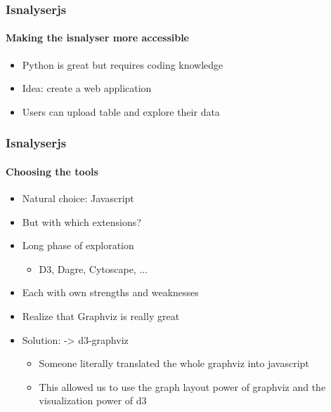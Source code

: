 \documentclass[9pt]{beamer}
\begin{document}
\begin{frame}
\frametitle{Isnalyserjs}
\framesubtitle{Making the isnalyser more accessible}
\begin{itemize}%
	\item Python is great but requires coding knowledge
	\item Idea: create a web application
	\item Users can upload table and explore their data
\end{itemize}
\end{frame} 



\begin{frame}
\frametitle{Isnalyserjs}
\framesubtitle{Choosing the tools}
\begin{itemize}%
	\item Natural choice: Javascript
	\item But with which extensions?
	\item Long phase of exploration
	\begin{itemize}
		\item D3, Dagre, Cytoscape, ...
	\end{itemize}
	\item Each with own strengths and weaknesses
	\item Realize that Graphviz is really great
	\item Solution: -> d3-graphviz
	\begin{itemize}
		\item Someone literally translated the whole graphviz into javascript
		\item This allowed us to use the graph layout power of graphviz and the visualization power of d3
	\end{itemize}
\end{itemize}
\end{frame} 
\end{document}
